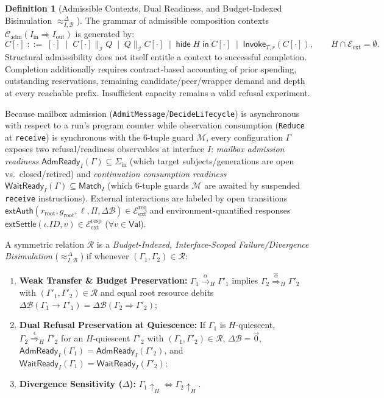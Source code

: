 \documentclass[11pt,a4paper]{article}
\theoremstyle{definition}
\newtheorem{definition}[theorem]{Definition}
\theoremstyle{remark}
\newcommand{\Val}{\mathsf{Val}}
\begin{document}
\begin{definition}[Admissible Contexts, Dual Readiness, and Budget-Indexed Bisimulation $\approx^{\Delta}_{I,\mathcal{B}}$]
The grammar of admissible composition contexts $\mathcal{C}_{\text{adm}}(I_{\text{in}} \Rightarrow I_{\text{out}})$ is generated by:
\[
  C[\cdot] \;::=\; [\cdot] \;\mid\; C[\cdot] \parallel_{\mathcal{I}} Q \;\mid\; Q \parallel_{\mathcal{I}} C[\cdot] \;\mid\; \mathsf{hide}\; H \;\mathsf{in}\; C[\cdot] \;\mid\; \mathsf{Invoke}_{T,r}(C[\cdot]), \qquad H \cap \mathcal{E}_{\text{ext}} = \emptyset.
\]
Structural admissibility does not itself entitle a context to successful completion. Completion additionally requires contract-based accounting of prior spending, outstanding reservations, remaining candidate/peer/wrapper demand and depth at every reachable prefix. Insufficient capacity remains a valid refusal experiment.

Because mailbox admission (\texttt{AdmitMessage}/\texttt{DecideLifecycle}) is asynchronous with respect to a run's program counter while observation consumption (\texttt{Reduce} at \texttt{receive}) is synchronous with the 6-tuple guard $\mathcal{M}$, every configuration $\Gamma$ exposes two refusal/readiness observables at interface $I$: \emph{mailbox admission readiness} $\mathsf{AdmReady}_I(\Gamma) \subseteq \Sigma_{\text{in}}$ (which target subjects/generations are open vs.\ closed/retired) and \emph{continuation consumption readiness} $\mathsf{WaitReady}_I(\Gamma) \subseteq \mathsf{Match}_I$ (which 6-tuple guards $\mathcal{M}$ are awaited by suspended \texttt{receive} instructions). External interactions are labeled by open transitions $\mathsf{extAuth}(r_{\text{root}}, g_{\text{root}}, \ell, \Pi, \Delta\mathcal{B}) \in \mathcal{E}_{\text{ext}}^{\text{req}}$ and environment-quantified responses $\mathsf{extSettle}(\iota.\mathit{ID}, v) \in \mathcal{E}_{\text{ext}}^{\text{resp}}$ ($\forall v \in \Val$).

A symmetric relation $\mathcal{R}$ is a \emph{Budget-Indexed, Interface-Scoped Failure/Divergence Bisimulation} ($\approx^{\Delta}_{I,\mathcal{B}}$) if whenever $(\Gamma_1, \Gamma_2) \in \mathcal{R}$:
\begin{enumerate}
  \item \textbf{Weak Transfer \& Budget Preservation:} $\Gamma_1 \xrightarrow{\alpha}_H \Gamma'_1$ implies $\Gamma_2 \stackrel{\hat{\alpha}}{\Longrightarrow}_H \Gamma'_2$ with $(\Gamma'_1, \Gamma'_2) \in \mathcal{R}$ and equal root resource debits $\Delta\mathcal{B}(\Gamma_1 \to \Gamma'_1) = \Delta\mathcal{B}(\Gamma_2 \Rightarrow \Gamma'_2)$;
  \item \textbf{Dual Refusal Preservation at Quiescence:} If $\Gamma_1$ is $H$-quiescent, $\Gamma_2 \stackrel{\epsilon}{\Longrightarrow}_H \Gamma'_2$ for an $H$-quiescent $\Gamma'_2$ with $(\Gamma_1, \Gamma'_2) \in \mathcal{R}$, $\Delta\mathcal{B} = \vec{0}$, $\mathsf{AdmReady}_I(\Gamma_1) = \mathsf{AdmReady}_I(\Gamma'_2)$, and $\mathsf{WaitReady}_I(\Gamma_1) = \mathsf{WaitReady}_I(\Gamma'_2)$;
  \item \textbf{Divergence Sensitivity ($\Delta$):} $\Gamma_1 \uparrow_H \iff \Gamma_2 \uparrow_H$.
\end{enumerate}
\end{definition}
\end{document}
